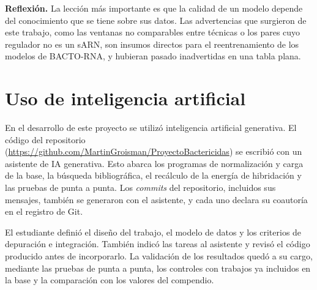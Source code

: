 \documentclass[11pt,a4paper]{article}
\newcommand{\repo}{\url{https://github.com/MartinGroisman/ProyectoBactericidas}}
\begin{document}
\textbf{Reflexión.} La lección más importante es que la calidad de un modelo depende del conocimiento que se tiene sobre sus datos. Las advertencias que surgieron de este trabajo, como las ventanas no comparables entre técnicas o los pares cuyo regulador no es un sARN, son insumos directos para el reentrenamiento de los modelos de BACTO-RNA, y hubieran pasado inadvertidas en una tabla plana.

\section{Uso de inteligencia artificial}
\label{sec:ia}

En el desarrollo de este proyecto se utilizó inteligencia artificial generativa. El código del repositorio (\repo) se escribió con un asistente de IA generativa. Esto abarca los programas de normalización y carga de la base, la búsqueda bibliográfica, el recálculo de la energía de hibridación y las pruebas de punta a punta. Los \emph{commits} del repositorio, incluidos sus mensajes, también se generaron con el asistente, y cada uno declara su coautoría en el registro de Git.

El estudiante definió el diseño del trabajo, el modelo de datos y los criterios de depuración e integración. También indicó las tareas al asistente y revisó el código producido antes de incorporarlo. La validación de los resultados quedó a su cargo, mediante las pruebas de punta a punta, los controles con trabajos ya incluidos en la base y la comparación con los valores del compendio.
\end{document}
